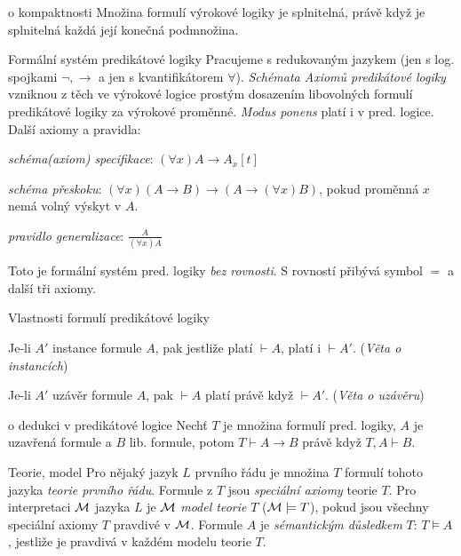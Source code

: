 \begin{vetaN}{o kompaktnosti}
Množina formulí výrokové logiky je splnitelná, právě když je splnitelná každá její konečná podmnožina.
\end{vetaN}


\begin{definiceN}{Formální systém predikátové logiky}
Pracujeme s redukovaným jazykem (jen s log. spojkami $\neg,\rightarrow$ a jen s kvantifikátorem $\forall$). \emph{Schémata Axiomů predikátové logiky} vzniknou z těch ve výrokové logice prostým dosazením libovolných formulí predikátové logiky za výrokové proměnné. \emph{Modus ponens} platí i v pred. logice. Další axiomy a pravidla:
\begin{pitemize}
    \item \emph{schéma(axiom) specifikace}: $(\forall x)A\rightarrow A_x[t]$
    \item \emph{schéma přeskoku}: $(\forall x)(A\rightarrow B)\rightarrow (A\rightarrow(\forall x)B)$, pokud 
	proměnná $x$ nemá volný výskyt v $A$.
    \item \emph{pravidlo generalizace}: $\frac{A}{(\forall x)A}$
\end{pitemize}
Toto je formální systém pred. logiky \emph{bez rovnosti}. S rovností přibývá symbol $=$ a další tři axiomy.
\end{definiceN}


\begin{poznamkaN}{Vlastnosti formulí predikátové logiky}
\begin{penumerate}
    \item Je-li $A'$ instance formule $A$, pak jestliže platí $\vdash A$, platí i $\vdash A'$.
	(\emph{Věta o instancích})
    \item Je-li $A'$ uzávěr formule $A$, pak $\vdash A$ platí právě když $\vdash A'$. 
	(\emph{Věta o uzávěru})
\end{penumerate}
\end{poznamkaN}

\begin{vetaN}{o dedukci v predikátové logice}
Nechť $T$ je množina formulí pred. logiky, $A$ je uzavřená formule a $B$ lib. formule, potom $T\vdash A\rightarrow B$ právě když $T,A\vdash B$.
\end{vetaN}

\begin{definiceN}{Teorie, model}
Pro nějaký jazyk $L$ prvního řádu je množina $T$ formulí tohoto jazyka \emph{teorie prvního řádu}. Formule z $T$ jsou \emph{speciální axiomy} teorie $T$. Pro interpretaci $\mathcal{M}$ jazyka $L$ je $\mathcal{M}$ \emph{model teorie} $T$ ($\mathcal{M}\models T$), pokud jsou všechny speciální axiomy $T$ pravdivé v $\mathcal{M}$. Formule $A$ je \emph{sémantickým důsledkem} $T$: $T\models A$, jestliže je pravdivá v každém modelu teorie $T$.
\end{definiceN}

